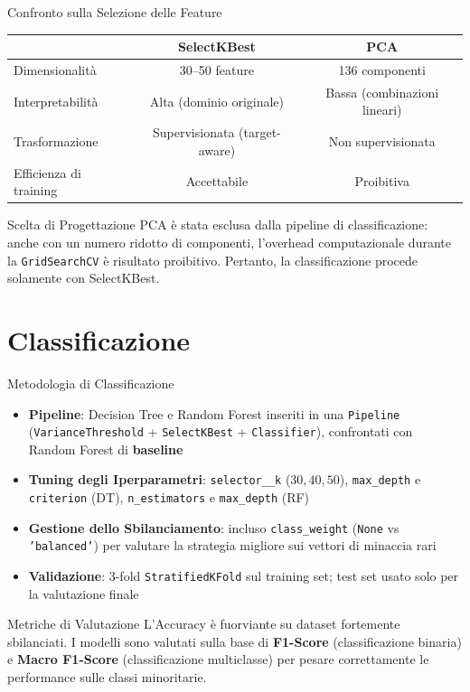 \documentclass{beamer}
\begin{document}
\begin{frame}{Confronto sulla Selezione delle Feature}
    \small
    \begin{tabular}{lcc}
      \toprule
       & \textbf{SelectKBest} & \textbf{PCA} \\
      \midrule
      Dimensionalità & 30--50 feature & 136 componenti \\
      Interpretabilità & Alta (dominio originale) & Bassa (combinazioni lineari) \\
      Trasformazione & Supervisionata (target-aware) & Non supervisionata \\
      Efficienza di training & Accettabile & Proibitiva \\
      \bottomrule
    \end{tabular}
  \vspace{0.5cm}
  \begin{alertblock}{Scelta di Progettazione}
    PCA è stata esclusa dalla pipeline di classificazione: anche con un numero ridotto di componenti, l'overhead computazionale durante la \texttt{GridSearchCV} è risultato proibitivo. Pertanto, la classificazione procede solamente con SelectKBest.
  \end{alertblock}
\end{frame}

\section{Classificazione}

\begin{frame}{Metodologia di Classificazione}
  \begin{itemize}
    \item \textbf{Pipeline}: Decision Tree e Random Forest inseriti in una \texttt{Pipeline} (\texttt{VarianceThreshold} + \texttt{SelectKBest} + \texttt{Classifier}), confrontati con Random Forest di \textbf{baseline}
    \item \textbf{Tuning degli Iperparametri}: \texttt{selector\_\_k} ($30, 40, 50$), \texttt{max\_depth} e \texttt{criterion} (DT), \texttt{n\_estimators} e \texttt{max\_depth} (RF)
    \item \textbf{Gestione dello Sbilanciamento}: incluso \texttt{class\_weight} (\texttt{None} vs \texttt{'balanced'}) per valutare la strategia migliore sui vettori di minaccia rari
    \item \textbf{Validazione}: 3-fold \texttt{StratifiedKFold} sul training set; test set usato solo per la valutazione finale
  \end{itemize}
  \begin{block}{Metriche di Valutazione}
    L'Accuracy è fuorviante su dataset fortemente sbilanciati. I modelli sono valutati sulla base di \textbf{F1-Score} (classificazione binaria) e \textbf{Macro F1-Score} 
    (classificazione multiclasse) per pesare correttamente le performance sulle classi minoritarie.
  \end{block}
\end{frame}
\end{document}
